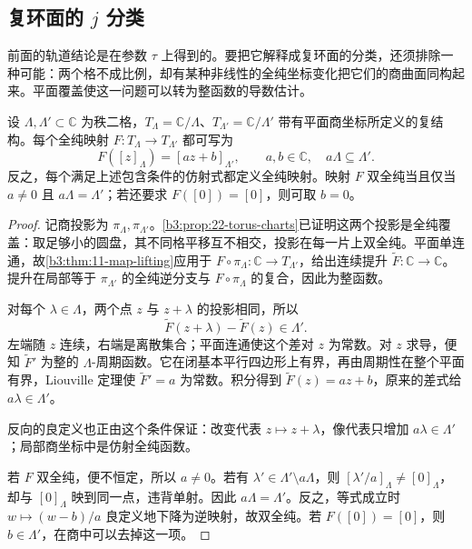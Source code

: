 \subsection{复环面的 \texorpdfstring{\(j\)}{j} 分类}
\label{b3:subsec:230603}

前面的轨道结论是在参数 \(\tau\) 上得到的。要把它解释成复环面的分类，还须排除一种可能：两个格不成比例，却有某种非线性的全纯坐标变化把它们的商曲面同构起来。平面覆盖使这一问题可以转为整函数的导数估计。

\begin{proposition}[复环面之间的全纯映射]\label{b3:prop:23-torus-affine}
设 \(\Lambda,\Lambda'\subset\mathbb C\) 为秩二格，\(T_\Lambda=\mathbb C/\Lambda\)、\(T_{\Lambda'}=\mathbb C/\Lambda'\) 带有平面商坐标所定义的复结构。每个全纯映射 \(F:T_\Lambda\to T_{\Lambda'}\) 都可写为
\[
 F([z]_\Lambda)=[az+b]_{\Lambda'},\qquad
 a,b\in\mathbb C,\quad a\Lambda\subseteq\Lambda'.
\]
反之，每个满足上述包含条件的仿射式都定义全纯映射。映射 \(F\) 双全纯当且仅当 \(a\ne0\) 且 \(a\Lambda=\Lambda'\)；若还要求 \(F([0])=[0]\)，则可取 \(b=0\)。
\end{proposition}
\begin{proof}
记商投影为 \(\pi_\Lambda,\pi_{\Lambda'}\)。\cref{b3:prop:22-torus-charts}已证明这两个投影是全纯覆盖：取足够小的圆盘，其不同格平移互不相交，投影在每一片上双全纯。平面单连通，故\cref{b3:thm:11-map-lifting}应用于 \(F\circ\pi_\Lambda:\mathbb C\to T_{\Lambda'}\)，给出连续提升 \(\widetilde F:\mathbb C\to\mathbb C\)。提升在局部等于 \(\pi_{\Lambda'}\) 的全纯逆分支与 \(F\circ\pi_\Lambda\) 的复合，因此为整函数。

对每个 \(\lambda\in\Lambda\)，两个点 \(z\) 与 \(z+\lambda\) 的投影相同，所以
\[
 \widetilde F(z+\lambda)-\widetilde F(z)\in\Lambda'.
\]
左端随 \(z\) 连续，右端是离散集合；平面连通使这个差对 \(z\) 为常数。对 \(z\) 求导，便知 \(\widetilde F'\) 为整的 \(\Lambda\)-周期函数。它在闭基本平行四边形上有界，再由周期性在整个平面有界，Liouville 定理使 \(\widetilde F'=a\) 为常数。积分得到 \(\widetilde F(z)=az+b\)，原来的差式给 \(a\lambda\in\Lambda'\)。

反向的良定义也正由这个条件保证：改变代表 \(z\mapsto z+\lambda\)，像代表只增加 \(a\lambda\in\Lambda'\)；局部商坐标中是仿射全纯函数。

若 \(F\) 双全纯，便不恒定，所以 \(a\ne0\)。若有 \(\lambda'\in\Lambda'\setminus a\Lambda\)，则 \([\lambda'/a]_\Lambda\ne[0]_\Lambda\)，却与 \([0]_\Lambda\) 映到同一点，违背单射。因此 \(a\Lambda=\Lambda'\)。反之，等式成立时 \(w\mapsto(w-b)/a\) 良定义地下降为逆映射，故双全纯。若 \(F([0])=[0]\)，则 \(b\in\Lambda'\)，在商中可以去掉这一项。
\end{proof}


